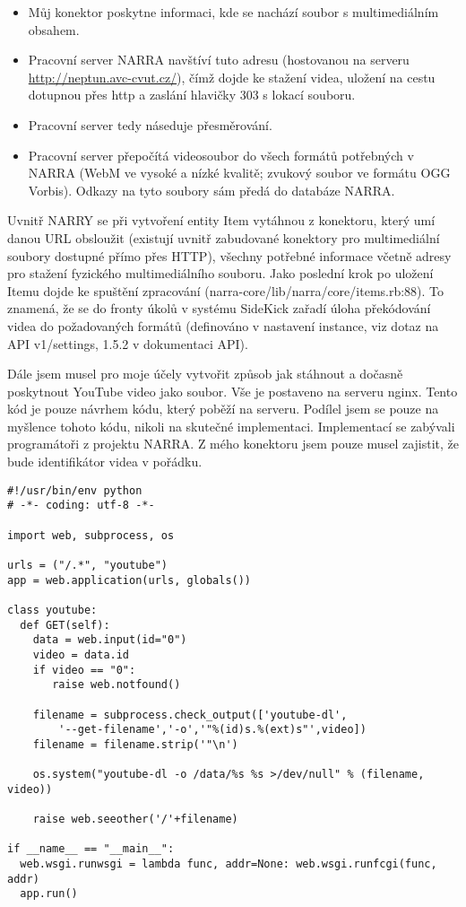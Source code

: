 \begin{itemize}
\item Můj konektor poskytne informaci, kde se nachází soubor s multimediálním obsahem.
\item Pracovní server NARRA navštíví tuto adresu (hostovanou na serveru \url{http://neptun.avc-cvut.cz/}), čímž dojde ke stažení videa, uložení na cestu dotupnou přes http a zaslání hlavičky 303 s lokací souboru.
\item Pracovní server tedy náseduje přesměrování. %
\item Pracovní server přepočítá videosoubor do všech formátů potřebných v NARRA (WebM ve vysoké a nízké kvalitě; zvukový soubor ve formátu OGG Vorbis). Odkazy na tyto soubory sám předá do databáze NARRA.
\end{itemize}

\par Uvnitř NARRY se při vytvoření entity Item vytáhnou z konektoru, který umí danou URL obsloužit (existují uvnitř zabudované konektory pro multimediální soubory dostupné přímo přes HTTP), všechny potřebné informace včetně adresy pro stažení fyzického multimediálního souboru. Jako poslední krok po uložení Itemu dojde ke spuštění zpracování (narra-core/lib/narra/core/\newline items.rb:88). To znamená, že se do fronty úkolů v systému SideKick zařadí úloha překódování videa do požadovaných formátů (definováno v nastavení instance, viz dotaz na API v1/settings, 1.5.2 v dokumentaci API).
\par Dále jsem musel pro moje účely vytvořit způsob jak stáhnout a dočasně poskytnout YouTube video jako soubor. Vše je postaveno na serveru nginx. Tento kód je pouze návrhem kódu, který poběží na serveru. Podílel jsem se pouze na myšlence tohoto kódu, nikoli na skutečné implementaci. Implementací se zabývali programátoři z projektu NARRA. Z mého konektoru jsem pouze musel zajistit, že bude identifikátor videa v pořádku.

\begin{verbatim}
#!/usr/bin/env python
# -*- coding: utf-8 -*-

import web, subprocess, os

urls = ("/.*", "youtube")
app = web.application(urls, globals())

class youtube:
  def GET(self):
    data = web.input(id="0")
    video = data.id
    if video == "0":
       raise web.notfound()
 
    filename = subprocess.check_output(['youtube-dl',
        '--get-filename','-o','"%(id)s.%(ext)s"',video])
    filename = filename.strip('"\n')
    
    os.system("youtube-dl -o /data/%s %s >/dev/null" % (filename, video))
 
    raise web.seeother('/'+filename)
 
if __name__ == "__main__":
  web.wsgi.runwsgi = lambda func, addr=None: web.wsgi.runfcgi(func, addr)
  app.run()
\end{verbatim}